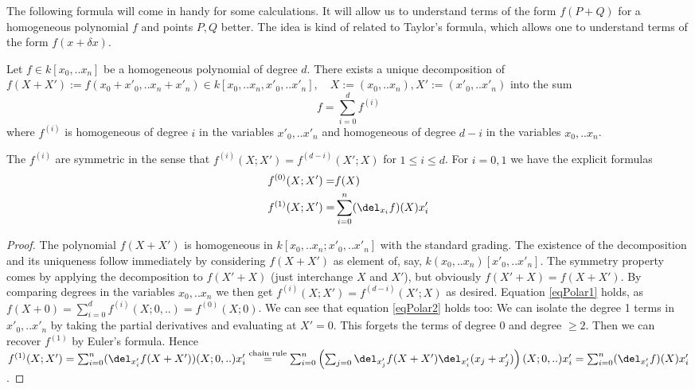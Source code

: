 The following formula will come in handy for some calculations.
It will allow us to understand terms of the form $f(P+Q)$ for a homogeneous polynomial $f$ and points $P,Q$ better.
The idea is kind of related to Taylor's formula, which allows one to understand terms of the form $f(x + \delta x)$.
\begin{proposition} \label{propositionTaylor}
Let $f \in k[x_0,..x_n]$ be a homogeneous polynomial of degree $d$.
There exists a unique decomposition of $f(X+X') := f(x_0+x'_0,..x_n+x'_n) \in k[x_0,..x_n,x'_0,..x'_n], \quad X := (x_0,..x_n), X' := (x'_0,..x'_n)$ into the sum
\begin{equation}
f = \sum_{i=0}^d f^{(i)}
\end{equation}
where $f^{(i)}$ is homogeneous of degree $i$ in the variables $x'_0,..x'_n$ and homogeneous of degree $d-i$ in the variables $x_0,..x_n$.

The $f^{(i)}$ are symmetric in the sense that $f^{(i)}(X;X') = f^{(d-i)}(X';X)$ for $1 \leq i \leq d$.
For $i = 0,1$ we have the explicit formulas
\begin{align}
f^{(0)}(X;X') =& f(X)  \label{eqPolar1}
\\ f^{(1)}(X;X') =& \sum_{i=0}^n (\del_{x_i}f)(X) x'_i \label{eqPolar2}
\end{align}
\end{proposition}
\begin{proof}
The polynomial $f(X+X')$ is homogeneous in $k[x_0,..x_n;x'_0,..x'_n]$ with the standard grading.
The existence of the decomposition and its uniqueness follow immediately by considering $f(X+X')$ as element of, say, $k(x_0,..x_n)[x'_0,..x'_n]$.
The symmetry property comes by applying the decomposition to $f(X'+X)$ (just interchange $X$ and $X'$), but obviously $f(X'+X) = f(X+X')$.
By comparing degrees in the variables $x_0,..x_n$ we then get $f^{(i)}(X;X') = f^{(d-i)}(X';X)$ as desired.
Equation \ref{eqPolar1} holds, as $f(X+0) = \sum_{i=0}^d f^{(i)}(X;0,..) = f^{(0)}(X;0)$.
We can see that equation \ref{eqPolar2} holds too:
We can isolate the degree 1 terms in $x'_0,..x'_n$ by taking the partial derivatives and evaluating at $X'=0$.
This forgets the terms of degree 0 and degree $\geq 2$.
Then we can recover $f^{(1)}$ by Euler's formula.
Hence $f^{(1)}(X;X') = \sum_{i=0}^n (\del_{x'_i}f(X+X'))(X;0,..) x'_i
\overset{\text{chain rule}}= \sum_{i=0}^n \left( \sum_{j=0} \del_{x'_j}f(X+X') \del_{x'_i}(x_j + x'_j) \right)(X;0,..)x'_i = \sum_{i=0}^n (\del_{x'_i} f)(X) x'_i$.
\end{proof}

